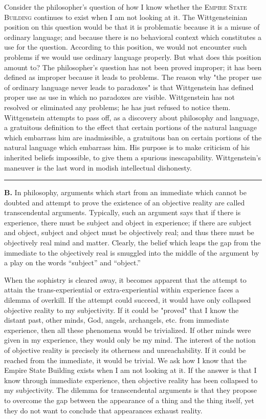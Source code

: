 \documentclass[10pt,twoside]{memoir}
\newcommand{\gap}{\plainbreak{2}}
\begin{document}
\begin{enumerate}
Consider the philosopher's question of how I know whether the \textsc{Empire 
State Building} continues to exist when I am not looking at it. The 
Wittgensteinian position on this question would be that it is problematic 
because it is a misuse of ordinary language; and because there is no 
behavioral context which constitutes a use for the question. According to 
this position, we would not encounter such problems if we would use 
ordinary language properly. But what does this position amount to? The 
philosopher's question has not been proved improper; it has been defined as 
improper because it leads to problems. The reason why "the proper use of 
ordinary language never leads to paradoxes" is that Wittgenstein has defined 
proper use as use in which no paradoxes are visible. Wittgenstein has not 
resolved or eliminated any problems; he has just refused to notice them. 
Wittgenstein attempts to pass off, as a discovery about philosophy and 
language, a gratuitous definition to the effect that certain portions of the 
natural language which embarrass him are inadmissible, a gratuitous ban on 
certain portions of the natural language which embarrass him. His purpose is 
to make criticism of his inherited beliefs impossible, to give them a spurious 
inescapability. Wittgenstein's maneuver is the last word in modish 
intellectual dishonesty. 

\gap

\textbf{B.} In philosophy, arguments which start from an immediate which 
cannot be doubted and attempt to prove the existence of an objective reality 
are called transcendental arguments. Typically, such an argument says that if 
there is experience, there must be subject and object in experience; if there 
are subject and object, subject and object must be objectively real; and thus 
there must be objectively real mind and matter. Clearly, the belief which 
leaps the gap from the immediate to the objectively real is smuggled into the 
middle of the argument by a play on the words \enquote{subject} and \enquote{object.} 

When the sophistry is cleared away, it becomes apparent that the 
attempt to attain the trans-experiential or extra-experiential within 
experience faces a dilemma of overkill. If the attempt could succeed, it 
would have only collapsed objective reality to my subjectivity. If it could be 
"proved" that I know the distant past, other minds, God, angels, archangels, 
etc. from immediate experience, then all these phenomena would be 
trivialized. If other minds were given in my experience, they would only be 
my mind. The interest of the notion of objective reality is precisely its 
otherness and unreachability. If it could be reached from the immediate, it 
would be trivial. We ask how I know that the Empire State Building exists 
when I am not looking at it. If the answer is that I know through immediate 
experience, then objective reality has been collapsed to my subjectivity. The 
dilemma for transcendental arguments is that they propose to overcome the 
gap between the appearance of a thing and the thing itself, yet they do not 
want to conclude that appearances exhaust reality. 


\end{enumerate}
\end{document}
